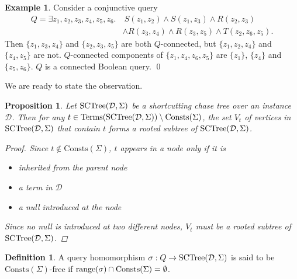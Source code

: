 \documentclass[12pt]{report}
\theoremstyle{plain}
\newtheorem{proposition}[theorem]{Proposition}
\theoremstyle{definition}
\newtheorem{definition}[theorem]{Definition}
\newtheorem{example}[theorem]{Example}
\def\Consts{{\mathrm{Consts}}}
\def\Terms{{\mathrm{Terms}}}
\newcommand{\range}[1]{\ensuremath{\normalfont{\operatorname{range}}\!\left( #1 \right)}}
\newcommand{\SCTree}[2]{\ensuremath{\normalfont{\textrm{SCTree}}\!\left( #1, #2 \right)}}
\begin{document}
\begin{example}
\label{example:query-connectedness}
  Consider a conjunctive query
  \begin{align*}
    Q = \exists z_1,z_2,z_3,z_4,z_5,z_6.&\ S(z_1, z_2) \wedge S(z_1,z_3) \wedge R(z_2, z_3) \\
    &\wedge R(z_3, z_4) \wedge R(z_3, z_5) \wedge T(z_2, z_6, z_5).
  \end{align*}
  Then $\{z_1, z_3, z_4\}$ and $\{z_2, z_3, z_5\}$ are both $Q$-connected, but $\{z_1, z_2, z_4\}$ and $\{z_4, z_5\}$ are not. $Q$-connected components of $\{z_1, z_4, z_6, z_5\}$ are $\{z_1\}$, $\{z_4\}$ and $\{z_5, z_6\}$. $Q$ is a connected Boolean query.
  \qed
\end{example}

We are ready to state the observation.

\begin{proposition}
\label{proposition:term-subtree-is-connected-for-non-rule-constants}
  Let $\SCTree{\mathcal{D}}{\Sigma}$ be a shortcutting chase tree over an instance $\mathcal{D}$. Then for any $t \in \Terms(\SCTree{\mathcal{D}}{\Sigma}) \setminus \Consts(\Sigma)$, the set $V_t$ of vertices in $\SCTree{\mathcal{D}}{\Sigma}$ that contain $t$ forms a rooted subtree of $\SCTree{\mathcal{D}}{\Sigma}$.
  \begin{proof}
    Since $t \not\in \Consts(\Sigma)$, $t$ appears in a node only if it is
    \begin{itemize}
      \item inherited from the parent node
      \item a term in $\mathcal{D}$
      \item a null introduced at the node
    \end{itemize}
    Since no null is introduced at two different nodes, $V_t$ must be a rooted subtree of $\SCTree{\mathcal{D}}{\Sigma}$.
  \end{proof}
\end{proposition}

\begin{definition}
  A query homomorphism $\sigma: Q \rightarrow \SCTree{\mathcal{D}}{\Sigma}$ is said to be $\Consts(\Sigma)$-free if $\range{\sigma} \cap \Consts(\Sigma) = \emptyset$.
\end{definition}
\end{document}
